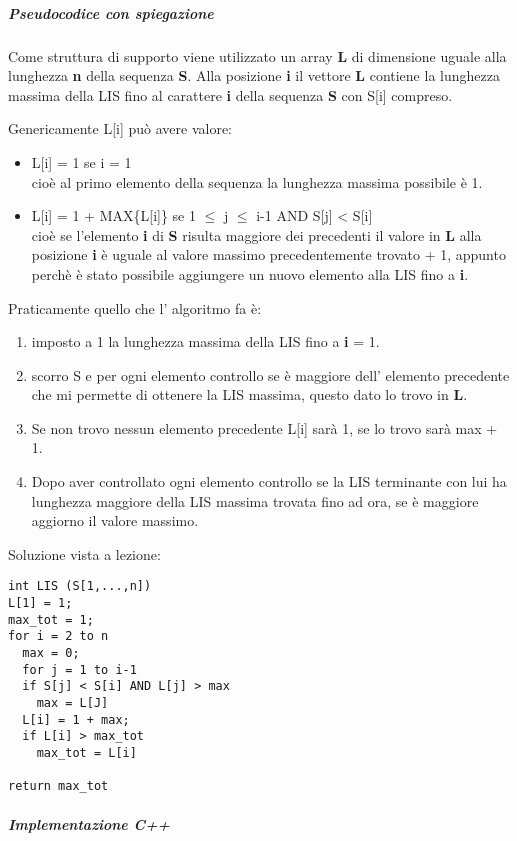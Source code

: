 \documentclass[11pt]{article}
\begin{document}
\subparagraph{Pseudocodice con spiegazione}
\label{sec:orgc0df957}

Come struttura di supporto viene utilizzato un array \textbf{L} di dimensione uguale alla
lunghezza \textbf{n} della sequenza \textbf{S}.
Alla posizione \textbf{i} il vettore \textbf{L} contiene la lunghezza massima della LIS fino al
carattere \textbf{i} della sequenza \textbf{S} con S[i] compreso.

Genericamente L[i] può avere valore:
\begin{itemize}
\item L[i] = 1 se i = 1\\
cioè al primo elemento della sequenza la lunghezza massima possibile è 1.
\item L[i] = 1 + MAX\{L[i]\} se 1 \(\le\) j \(\le\) i-1 AND S[j] < S[i] \\
cioè se l'elemento \textbf{i} di \textbf{S} risulta maggiore dei precedenti il valore in \textbf{L} alla posizione \textbf{i}
è uguale al valore massimo precedentemente trovato + 1, appunto perchè è stato possibile aggiungere
un nuovo elemento alla LIS fino a \textbf{i}.
\end{itemize}

Praticamente quello che l' algoritmo fa è:
\begin{enumerate}
\item imposto a 1 la lunghezza massima della LIS fino a \textbf{i} = 1.
\item scorro S e per ogni elemento controllo se è maggiore dell' elemento precedente che mi permette
di ottenere la LIS massima, questo dato lo trovo in \textbf{L}.
\item Se non trovo nessun elemento precedente L[i] sarà 1, se lo trovo sarà max + 1.
\item Dopo aver controllato ogni elemento controllo se la LIS terminante con lui ha lunghezza maggiore della
LIS massima trovata fino ad ora, se è maggiore aggiorno il valore massimo.
\end{enumerate}

Soluzione vista a lezione:
\begin{verbatim}
int LIS (S[1,...,n])
L[1] = 1;
max_tot = 1;
for i = 2 to n
  max = 0;
  for j = 1 to i-1
  if S[j] < S[i] AND L[j] > max
    max = L[J]
  L[i] = 1 + max;
  if L[i] > max_tot
    max_tot = L[i]

return max_tot
\end{verbatim}


\subparagraph{Implementazione C++}
\label{sec:org8692809}
\end{document}
